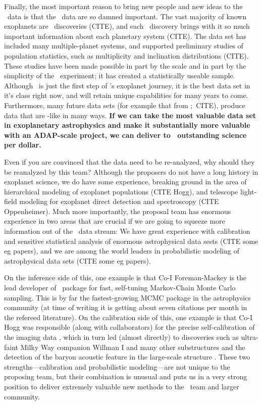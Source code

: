 \documentclass[letterpaper,12pt,preprint]{hack_aastex}
\newcommand{\emcee}{\package{emcee}}
\begin{document}
Finally, the most important reason to bring new people and new ideas
to the \Kepler\ data is that the \Kepler\ data are so damned
important.  The vast majority of known exoplanets are
\Kepler\ discoveries (CITE), and each \Kepler\ discovery brings with
it so much important information about each planetary system (CITE).
The data set has included many multiple-planet systems, and supported
preliminary studies of population statistics, such as multiplicity and
inclination distributions (CITE).  These studies have been made
possible in part by the scale and in part by the simplicity of the
\Kepler\ experiment; it has created a statistically useable sample.
Although \Kepler\ is just the first step of \NASA's exoplanet journey,
it is the best data set in it's class right now, and will retain
unique capabilities for many years to come.  Furthermore, many future
data sets (for example that from \TESS;\ CITE), produce data that are
\Kepler-like in many ways.  \textbf{If we can take the most valuable
  data set in exoplanetary astrophysics and make it substantially more
  valuable with an ADAP-scale project, we can deliver to
  \NASA\ outstanding science per dollar.}

Even if you are convinced that the data need to be re-analyzed, why
should they be reanalyzed by this team?  Although the proposers do not
have a long history in exoplanet science, we do have some experience,
breaking ground in the area of hierarchical modeling of exoplanet
populations (CITE Hogg), and telescope light-field modeling for
exoplanet direct detection and spectroscopy (CITE Oppenheimer).  Much
more importantly, the proposal team has enormous experience in two
areas that are crucial if we are going to squeeze more information out
of the \Kepler\ data stream: We have great experience with calibration
and sensitive statistical analysis of enormous astrophysical data
sests (CITE some eg papers), and we are among the world leaders in
probabilistic modeling of astrophysical data sets (CITE some eg
papers).

On the inference side of this,
one example is that Co-I Foreman-Mackey is the lead developer of \emcee\
package \citep{emcee} for fast, self-tuning Markov-Chain Monte Carlo sampling.
This is by far the fastest-growing MCMC package in the astrophysics community
 (at time of writing it is getting about seven citations per month in the
refereed literature).
On the calibration side of this,
one example is that Co-I Hogg was responsible (along with collaborators) for
the precise self-calibration of the \observatory{Sloan Digital Sky Survey}
imaging data \citep{ubercal}, which in turn led (almost directly)
to discoveries such as ultra-faint Milky Way companion Willman I
 \citep{wil1} and many other substructures \citep[for example,][]{wil2, field, gd1} and the detection of the baryon acoustic feature
in the large-scale structure \citep{bao}.  These two
strengths---calibration and probabilistic modeling---are not unique to
the proposing team, but their combination is unusual and puts us in a
very strong position to deliver extremely valuable new methods to the
\Kepler\ team and larger community.
\end{document}
